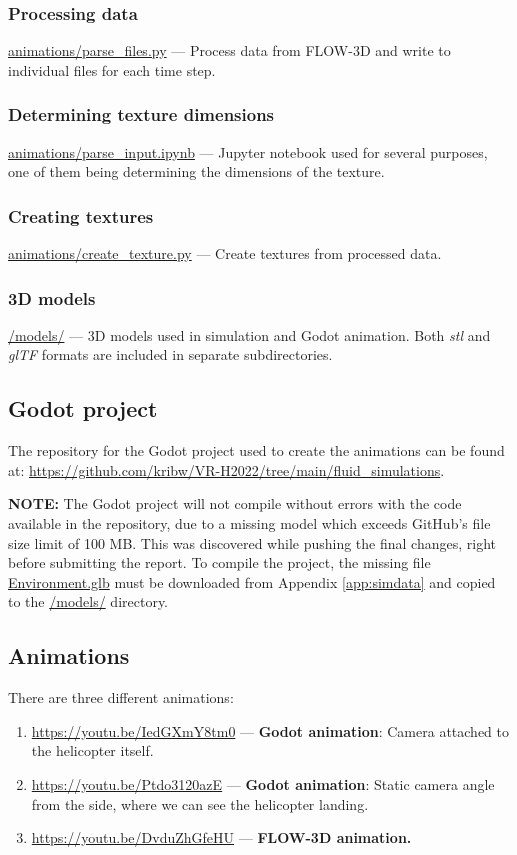 \documentclass[a4paper,11pt]{extarticle}
\begin{document}
\begin{appendices}
  \subsubsection{Processing data}\label{script:process}
  \url{animations/parse_files.py} --- Process data from FLOW-3D and write to individual files for each time step.

  \subsubsection{Determining texture dimensions}\label{script:dimensions}
  \url{animations/parse_input.ipynb} --- Jupyter notebook used for several purposes, one of them being determining the dimensions of the texture.

  \subsubsection{Creating textures}\label{script:texture}
  \url{animations/create_texture.py} --- Create textures from processed data.

  \subsubsection{3D models}\label{app:models}
  \url{/models/} --- 3D models used in simulation and Godot animation. Both \textit{stl} and \textit{glTF} formats are included in separate subdirectories.

  \subsection{Godot project}\label{src:godot}
  The repository for the Godot project used to create the animations can be found at: \url{https://github.com/kribw/VR-H2022/tree/main/fluid_simulations}.

  \textbf{NOTE:} The Godot project will not compile without errors with the code available in the repository, due to a missing model which exceeds GitHub's file size limit of 100 MB. This was discovered while pushing the final changes, right before submitting the report. To compile the project, the missing file \url{Environment.glb} must be downloaded from Appendix \ref{app:simdata} and copied to the \url{/models/} directory.

  \subsection{Animations}\label{app:animations}
  There are three different animations:

  \begin{enumerate}
    \item \url{https://youtu.be/IedGXmY8tm0} --- \textbf{Godot animation}: Camera attached to the helicopter itself.
    \item \url{https://youtu.be/Ptdo3120azE} --- \textbf{Godot animation}: Static camera angle from the side, where we can see the helicopter landing.
    \item \url{https://youtu.be/DvduZhGfeHU} --- \textbf{FLOW-3D animation.}
  \end{enumerate}

\end{appendices}
\end{document}
